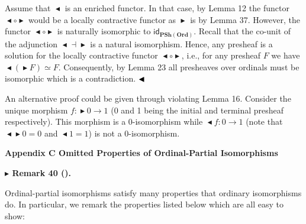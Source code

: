 
Assume that $\mathop{\blacktriangleleft}$ is an enriched functor. In that case, by Lemma 12 the functor $\mathop{\blacktriangleleft}\circ\mathop{\blacktriangleright}$ would be a locally contractive functor as $\mathop{\blacktriangleright}$ is by Lemma 37. However, the functor $\mathop{\blacktriangleleft}\circ\mathop{\blacktriangleright}$ is naturally isomorphic to $\mathsf{id}_{\mathbf{PSh}(\mathbf{Ord})}$. Recall that the co-unit of the adjunction $\mathop{\blacktriangleleft}\dashv\mathop{\blacktriangleright}$ is a natural isomorphism. Hence, any presheaf is a solution for the locally contractive functor $\mathop{\blacktriangleleft}\circ\mathop{\blacktriangleright}$, i.e., for any presheaf $F$ we have $\mathop{\blacktriangleleft}(\mathop{\blacktriangleright}F)\simeq F$. Consequently, by Lemma 23 all presheaves over ordinals must be isomorphic which is a contradiction. $\hfill\blacktriangleleft$\par
 
 
 
An alternative proof could be given through violating Lemma 16. Consider the unique morphism $f:\mathop{\blacktriangleright}0\to 1$ (0 and 1 being the initial and terminal presheaf respectively). This morphism is a $0$-isomorphism while $\mathop{\blacktriangleleft}f:0\to 1$ (note that $\mathop{\blacktriangleleft}\mathop{\blacktriangleright}0=0$ and $\mathop{\blacktriangleleft}1=1$) is not a 0-isomorphism.\par
 
 
 


 
\par\medskip\noindent\textbf{Appendix C Omitted Properties of Ordinal-Partial Isomorphisms}\par
 
 
\par\medskip\noindent\textbf{$\blacktriangleright$ Remark 40 ().}\par
 
 
Ordinal-partial isomorphisms satisfy many properties that ordinary isomorphisms do. In particular, we remark the properties listed below which are all easy to show:\par
  
